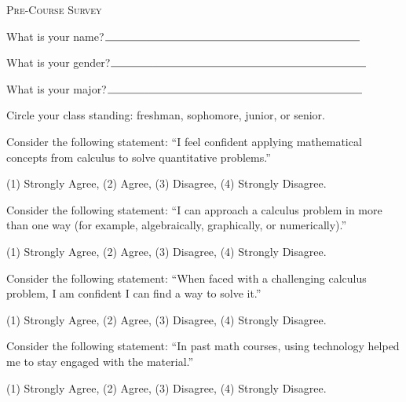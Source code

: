 \documentclass[11pt]{article}
\begin{document}
\begin{center}
\Large{\textsc{Pre-Course Survey }}\\
\end{center}



\begin{enumerate}[{$\qquad 1.]$}]
\item What is your name?$\line(1,0){38}\line(1,0){195}$
\item What is your gender?$\line(1,0){38}\line(1,0){195}$
\item What is your major?$\line(1,0){38}\line(1,0){195}$
\item Circle your class standing: freshman, sophomore, junior, or senior. 


\item Consider the following statement: ``I feel confident applying mathematical concepts from calculus to solve quantitative problems.''
\begin{center} 
(1) Strongly Agree, \qquad (2) Agree, \qquad (3) Disagree, \qquad (4) Strongly Disagree. \end{center}

\item Consider the following statement: ``I can approach a calculus problem in more than one way (for example, algebraically, graphically, or numerically).''
\begin{center} 
(1) Strongly Agree, \qquad (2) Agree, \qquad (3) Disagree, \qquad (4) Strongly Disagree. \end{center}

\item Consider the following statement: ``When faced with a challenging calculus problem, I am confident I can find a way to solve it.''
\begin{center} 
(1) Strongly Agree, \qquad (2) Agree, \qquad (3) Disagree, \qquad (4) Strongly Disagree. \end{center}


\item Consider the following statement: ``In past math courses, using technology helped me to stay engaged with the material.''
\begin{center}
(1) Strongly Agree, \qquad (2) Agree, \qquad (3) Disagree, \qquad (4) Strongly Disagree. \end{center}


\end{enumerate}
\end{document}
